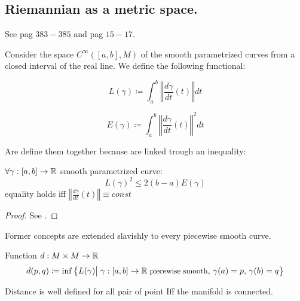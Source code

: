 \documentclass[a4paper,12pt]{scrartcl}    %
\begin{document}
\subsection{Riemannian as a metric space.}
 See \cite{Abate2011} pag $383-385$  and \cite{Jost2005} pag $15-17$.
 
 Consider the space $C^\infty([a,b],M)$ of the smooth parametrized curves from a closed interval of the real line.
 We define the following functional:
 \begin{definition}
 	\begin{displaymath}
 		L(\gamma) \coloneqq \int_a^b \left\Vert \frac{d \gamma}{dt} (t)\right\Vert dt
 	\end{displaymath}
\end{definition} 
 
\begin{definition}
  	\begin{displaymath}
 		E(\gamma) \coloneqq \int_a^b \left\Vert \frac{d \gamma}{dt} (t)\right\Vert^2 dt
 	\end{displaymath}
\end{definition} 
Are define them together because are linked trough an inequality:
\begin{proposition}
	$\forall \gamma : [a,b] \rightarrow \mathbb{R} $ smooth parametrized curve:
	\begin{equation}
		L(\gamma)^2 \leq 2(b-a)E(\gamma)
	\end{equation}
	equality holds iff $\left\Vert \frac{d \gamma}{dt} (t)\right\Vert \equiv const $
\end{proposition}	
\begin{proof}
	 See \cite[Lemma $1.4.2$ ]{Jost2005}.
\end{proof}
	
\begin{observation}
	Former concepts are extended slavishly to every piecewise smooth curve.
\end{observation}

\begin{definition}
	Function $d:M\times M \rightarrow \mathbb{R}$
	\begin{displaymath}
		d(p,q)\coloneqq \inf\big\{L(\gamma) \big\vert \; \gamma:[a,b]\rightarrow \mathbb{R} \; \textrm{\small piecewise smooth},\, \gamma(a)=p,\, \gamma(b)=q  \big\}
	\end{displaymath}
\end{definition}
\begin{observation}
	Distance is well defined for all pair of point Iff the manifold is connected. 
\end{observation}
\end{document}
